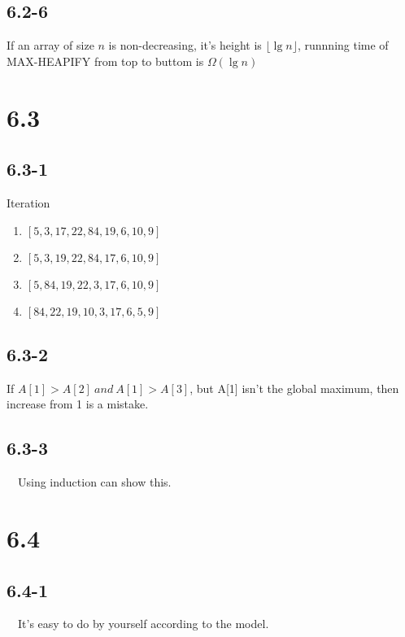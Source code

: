 \documentclass[10pt]{article}
\begin{document}
\subsection*{6.2-6}
If an array of size $n$ is non-decreasing, it's height is
$\lfloor {\lg n} \rfloor$, runnning time of MAX-HEAPIFY from top to buttom is $\Omega(\lg n)$

\section*{6.3}
\subsection*{6.3-1}
Iteration
\begin{enumerate}
\item $[5, 3, 17, 22, 84, 19, 6, 10, 9]$
\item $[5, 3, 19, 22, 84, 17, 6, 10, 9]$
\item $[5, 84, 19, 22, 3, 17, 6, 10, 9]$
\item $[84, 22, 19, 10, 3, 17, 6, 5, 9]$
\end{enumerate}

\subsection*{6.3-2}
If $A[1] > A[2] ~and~ A[1] > A[3]$, but A[1] isn't the global maximum, then increase from 1 is a mistake.

\subsection*{6.3-3}
~~Using induction can show this.

\section*{6.4}
\subsection*{6.4-1}
~~It's easy to do by yourself according to the model.
\end{document}

